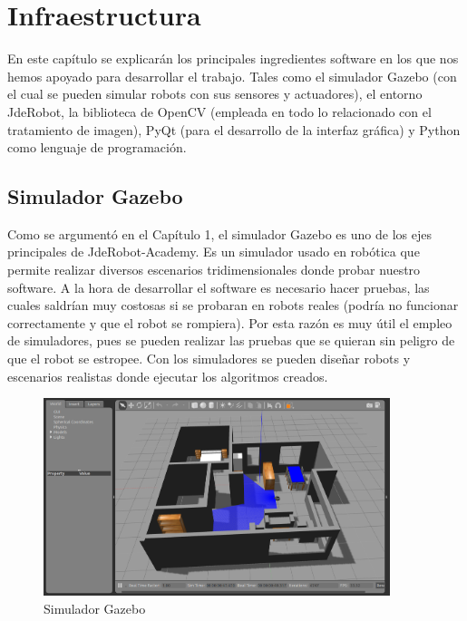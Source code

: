 \chapter{Infraestructura}\label{cap.infraestructura}
En este capítulo se explicarán los principales ingredientes software en los que nos hemos apoyado para desarrollar el trabajo. Tales como el simulador Gazebo (con el cual se pueden simular robots con sus sensores y actuadores), el entorno JdeRobot, la biblioteca de OpenCV (empleada en todo lo relacionado con el tratamiento de imagen), PyQt (para el desarrollo de la interfaz gráfica) y Python como lenguaje de programación.

\section{Simulador Gazebo}

Como se argumentó en el Capítulo 1, el simulador Gazebo es uno de los ejes principales de JdeRobot-Academy. Es un simulador usado en robótica que permite realizar diversos escenarios tridimensionales donde probar nuestro software. A la hora de desarrollar el software es necesario hacer pruebas, las cuales saldrían muy costosas si se probaran en robots reales (podría no funcionar correctamente y que el robot se rompiera). Por esta razón es muy útil el empleo de simuladores, pues se pueden realizar las pruebas que se quieran sin peligro de que el robot se estropee. Con los simuladores se pueden diseñar robots y escenarios realistas donde ejecutar los algoritmos creados.

\begin{figure}[H]
  \begin{center}
    \includegraphics[width=0.9\textwidth]{figures/Infraestructura/gazebo.png}
		\caption{Simulador Gazebo}
		\label{fig.gazebo}
		\end{center}
\end{figure}
 
